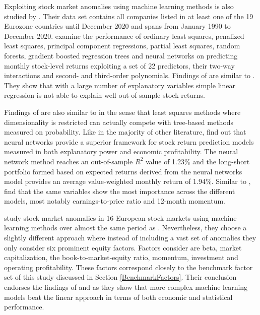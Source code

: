 \documentclass[12pt]{article}
\begin{document}
Exploiting stock market anomalies using machine learning methods is also studied by \citet{Drobetz}. Their data set contains all companies listed in at least one of the 19 Eurozone countries until December 2020 and spans from January 1990 to December 2020.\footnotemark {} \citeauthor{Drobetz} examine the performance of ordinary least squares, penalized least squares, principal component regressions, partial least squares, random forests, gradient boosted regression trees and neural networks on predicting monthly stock-level returns exploiting a set of 22 predictors, their two-way interactions and second- and third-order polynomials. Findings of \citeauthor{Drobetz} are similar to \citet{guetal}. They show that with a large number of explanatory variables simple linear regression is not able to explain well out-of-sample stock returns.\footnotemark {} \par

Findings of \citet{Drobetz} are also similar to \citet{TOBEK2021100588} in the sense that least squares methods where dimensionality is restricted can actually compete with tree-based methods measured on probability. Like in the majority of other literature, \citeauthor{Drobetz} find out that neural networks provide a superior framework for stock return prediction models measured in both explanatory power and economic profitability. The neural network method reaches an out-of-sample $R^{2}$ value of 1.23\% and the long-short portfolio formed based on expected returns derived from the neural networks model provides an average value-weighted monthly return of 1.94\%.\footnotemark {} Similar to \citet{guetal}, \citeauthor{Drobetz} find that the same variables show the most importance across the different models, most notably earnings-to-price ratio and 12-month momentum.\footnotemark {} \par

\citet*{Fieberg} study stock market anomalies in 16 European stock markets using machine learning methods over almost the same period as \citet{Drobetz}. Nevertheless, they choose a slightly different approach where instead of including a vast set of anomalies they only consider six prominent equity factors. Factors \citeauthor{Fieberg} consider are beta, market capitalization, the book-to-market-equity ratio, momentum, investment and operating profitability. These factors correspond closely to the benchmark factor set of this study discussed in Section \ref{BenchmarkFactors}. Their conclusion endorses the findings of \citet{Drobetz} and \citet{TOBEK2021100588} as they show that more complex machine learning models beat the linear approach in terms of both economic and statistical performance.\footnotemark {} \par
\end{document}

